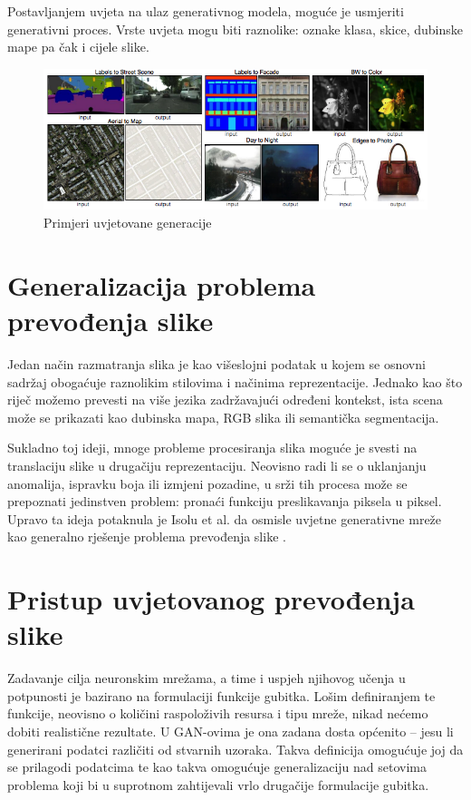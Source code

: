 \documentclass[lmodern, utf8, seminar]{fer}
\begin{document}
Postavljanjem uvjeta na ulaz generativnog modela, moguće je usmjeriti generativni proces. Vrste uvjeta mogu biti raznolike: oznake klasa, skice, dubinske mape pa čak i cijele slike.
\newline

\begin{figure}[H]
    \centering
    \includegraphics[width=1\textwidth]{isola2017-conditioned-generation}
    \caption{Primjeri uvjetovane generacije \cite{isola2017image}}
    \label{fig:isola2017-conditioned-generation}
\end{figure}

\newpage
\section{Generalizacija problema prevođenja slike}
Jedan način razmatranja slika je kao višeslojni podatak u kojem se osnovni sadržaj obogaćuje raznolikim stilovima i načinima reprezentacije. 
Jednako kao što riječ možemo prevesti na više jezika zadržavajući određeni kontekst, ista scena može se prikazati kao dubinska mapa, RGB slika ili semantička segmentacija. 
\newline

Sukladno toj ideji, mnoge probleme procesiranja slika moguće je svesti na translaciju slike u drugačiju reprezentaciju. Neovisno radi li se o uklanjanju anomalija, ispravku boja ili izmjeni pozadine, u srži tih procesa može se prepoznati jedinstven problem: pronaći funkciju preslikavanja piksela u piksel. Upravo ta ideja potaknula je Isolu et al. da osmisle uvjetne generativne mreže kao generalno rješenje problema prevođenja slike \cite{isola2017image}.
\newline

\section{Pristup uvjetovanog prevođenja slike}
Zadavanje cilja neuronskim mrežama, a time i uspjeh njihovog učenja u potpunosti je bazirano na formulaciji funkcije gubitka. Lošim definiranjem te funkcije, neovisno o količini raspoloživih resursa i tipu mreže, nikad nećemo dobiti realistične rezultate. U GAN-ovima je ona zadana dosta općenito -- jesu li generirani podatci različiti od stvarnih uzoraka. Takva definicija omogućuje joj da se prilagodi podatcima te kao takva omogućuje generalizaciju nad setovima problema koji bi u suprotnom zahtijevali vrlo drugačije formulacije gubitka. 
\newline
\end{document}
